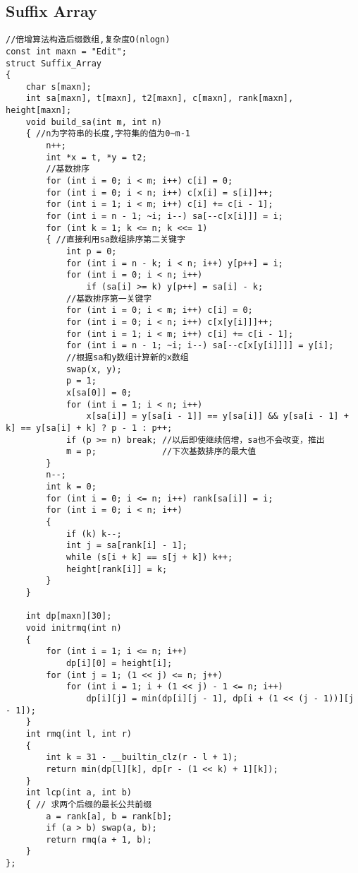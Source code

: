 \documentclass[twoside]{article}
\begin{document}
\subsection{Suffix Array}
\begin{lstlisting}
//倍增算法构造后缀数组,复杂度O(nlogn)
const int maxn = "Edit";
struct Suffix_Array
{
    char s[maxn];
    int sa[maxn], t[maxn], t2[maxn], c[maxn], rank[maxn], height[maxn];
    void build_sa(int m, int n)
    { //n为字符串的长度,字符集的值为0~m-1
        n++;
        int *x = t, *y = t2;
        //基数排序
        for (int i = 0; i < m; i++) c[i] = 0;
        for (int i = 0; i < n; i++) c[x[i] = s[i]]++;
        for (int i = 1; i < m; i++) c[i] += c[i - 1];
        for (int i = n - 1; ~i; i--) sa[--c[x[i]]] = i;
        for (int k = 1; k <= n; k <<= 1)
        { //直接利用sa数组排序第二关键字
            int p = 0;
            for (int i = n - k; i < n; i++) y[p++] = i;
            for (int i = 0; i < n; i++)
                if (sa[i] >= k) y[p++] = sa[i] - k;
            //基数排序第一关键字
            for (int i = 0; i < m; i++) c[i] = 0;
            for (int i = 0; i < n; i++) c[x[y[i]]]++;
            for (int i = 1; i < m; i++) c[i] += c[i - 1];
            for (int i = n - 1; ~i; i--) sa[--c[x[y[i]]]] = y[i];
            //根据sa和y数组计算新的x数组
            swap(x, y);
            p = 1;
            x[sa[0]] = 0;
            for (int i = 1; i < n; i++)
                x[sa[i]] = y[sa[i - 1]] == y[sa[i]] && y[sa[i - 1] + k] == y[sa[i] + k] ? p - 1 : p++;
            if (p >= n) break; //以后即使继续倍增，sa也不会改变，推出
            m = p;             //下次基数排序的最大值
        }
        n--;
        int k = 0;
        for (int i = 0; i <= n; i++) rank[sa[i]] = i;
        for (int i = 0; i < n; i++)
        {
            if (k) k--;
            int j = sa[rank[i] - 1];
            while (s[i + k] == s[j + k]) k++;
            height[rank[i]] = k;
        }
    }
    
    int dp[maxn][30];
    void initrmq(int n)
    {
        for (int i = 1; i <= n; i++)
            dp[i][0] = height[i];
        for (int j = 1; (1 << j) <= n; j++)
            for (int i = 1; i + (1 << j) - 1 <= n; i++)
                dp[i][j] = min(dp[i][j - 1], dp[i + (1 << (j - 1))][j - 1]);
    }
    int rmq(int l, int r)
    {
        int k = 31 - __builtin_clz(r - l + 1);
        return min(dp[l][k], dp[r - (1 << k) + 1][k]);
    }
    int lcp(int a, int b)
    { // 求两个后缀的最长公共前缀
        a = rank[a], b = rank[b];
        if (a > b) swap(a, b);
        return rmq(a + 1, b);
    }
};
\end{lstlisting}
\end{document}
